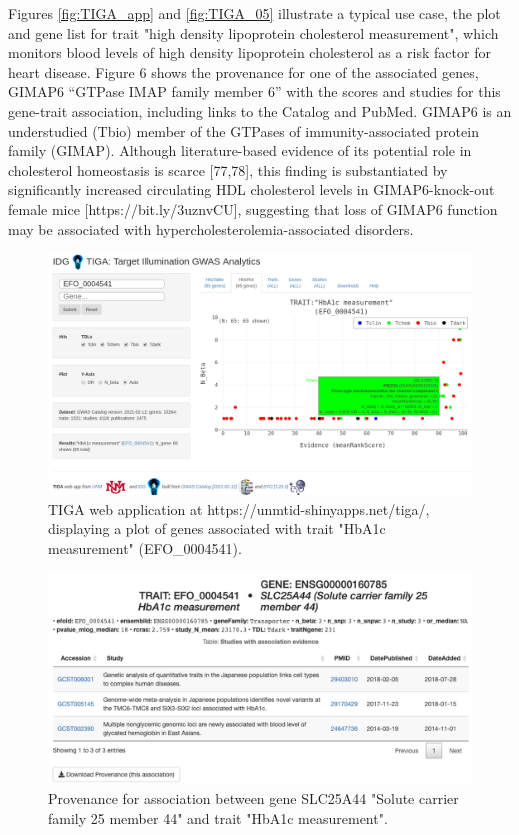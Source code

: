 Figures \ref{fig:TIGA_app} and \ref{fig:TIGA_05} illustrate a typical use case, the plot and gene list for trait "high density lipoprotein cholesterol measurement", which monitors blood levels of high density lipoprotein cholesterol as a risk factor for heart disease. Figure 6 shows the provenance for one of the associated genes, GIMAP6 “GTPase IMAP family member 6” with the scores and studies for this gene-trait association, including links to the Catalog and PubMed. GIMAP6 is an understudied (Tbio) member of the GTPases of immunity-associated protein family (GIMAP). Although literature-based evidence of its potential role in cholesterol homeostasis is scarce [77,78], this finding is substantiated by significantly increased circulating HDL cholesterol levels in GIMAP6-knock-out female mice [https://bit.ly/3uznvCU], suggesting that loss of GIMAP6 function may be associated with hypercholesterolemia-associated disorders.

\begin{figure}
	\includegraphics[width=\textwidth]{figures/tiga/FIG07_ EFO_0004541_Plot.png}
	\caption{TIGA web application at https://unmtid-shinyapps.net/tiga/, displaying a plot of genes associated with trait "HbA1c measurement" (EFO\_0004541).}
	\label{fig:TIGA_07}
\end{figure}

\begin{figure}
	\includegraphics[width=\textwidth]{figures/tiga/FIG08_EFO_0004541-SLC25A44_provenance.png}
	\caption{Provenance for association between gene SLC25A44 "Solute carrier family 25 member 44" and trait "HbA1c measurement".}
	\label{fig:TIGA_08}
\end{figure}

